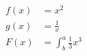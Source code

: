 \documentclass{article}
\begin{document}
\begin{align*}
f(x) &= x^2\\
g(x) &= \frac{1}{x}\\
F(x) &= \int^a_b \frac{1}{3}x^3
\end{align*}
\end{document}
